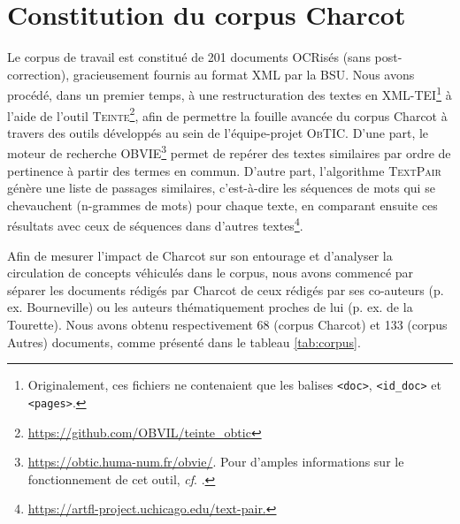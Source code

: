 \section{Constitution du corpus Charcot}
Le corpus de travail est constitué de 201 documents OCRisés (sans post-correction), gracieusement fournis au format \textsc{XML} par la \textsc{BSU}. Nous avons procédé, dans un premier temps, à une restructuration des textes en \textsc{XML-TEI}\footnote{Originalement, ces fichiers ne contenaient que les balises \texttt{<doc>}, \texttt{<id\_doc>} et \texttt{<pages>}.} à l'aide de l'outil \textsc{Teinte}\footnote{\url{https://github.com/OBVIL/teinte\_obtic}}, afin de permettre la fouille avancée du corpus Charcot à travers des outils développés au sein de l'équipe-projet \textsc{ObTIC}. D'une part, le moteur de recherche \textsc{OBVIE}\footnote{\url{https://obtic.huma-num.fr/obvie/}. Pour d'amples informations sur le fonctionnement de cet outil, \textit{cf}. \citet{alrahabi2022obvie}.} permet de repérer des textes similaires par ordre de pertinence à partir des termes en commun. D'autre part, l'algorithme \textsc{TextPair} génère une liste de passages similaires, c'est-à-dire les séquences de mots qui se chevauchent (n-grammes de mots) pour chaque texte, en comparant ensuite ces résultats avec ceux de séquences dans d'autres textes\footnote{\url{https://artfl-project.uchicago.edu/text-pair.}}.

Afin de mesurer l'impact de Charcot sur son entourage et d'analyser la circulation de concepts véhiculés dans le corpus, nous avons commencé par séparer les documents rédigés par Charcot de ceux rédigés par ses co-auteurs (p. ex. Bourneville) ou les auteurs thématiquement proches de lui (p. ex. de la Tourette). Nous avons obtenu respectivement 68 (corpus \og{}Charcot\fg{}) et 133 (corpus \og{}Autres\fg{}) documents, comme présenté dans le tableau \ref{tab:corpus}. 

